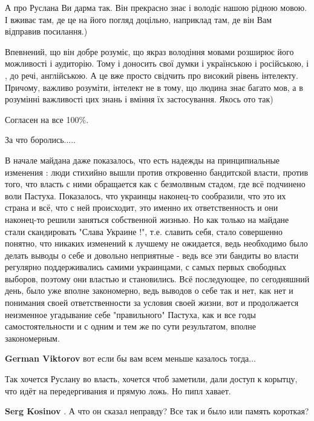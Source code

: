 \begin{itemize}
\begin{itemize}
А про Руслана Ви дарма так. Він прекрасно знає і володіє нашою рідною мовою. І
вживає там, де це на його погляд доцільно, наприклад там, де він Вам відправив
посилання.)

Впевнений, що він добре розуміє, що якраз володіння мовами розширює його
можливості і аудиторію. Тому і доносить свої думки і українською і російською,
і , до речі, англійською. А це вже просто свідчить про високий рівень
інтелекту. Причому, важливо розуміти, інтелект не в тому, що людина знає багато
мов, а в розумінні важливості цих знань і вміння їх застосування. Якось ото
так)

\end{itemize} %

Согласен на все 100\%.

За что боролись.....


В начале майдана даже показалось, что есть надежды на принципиальные изменения
: люди стихийно вышли против откровенно бандитской власти, против того, что
власть с ними обращается как с безмолвным стадом, где всё подчинено воли
Пастуха. Показалось, что украинцы наконец-то сообразили, что это их страна и
всё, что с ней происходит, это именно их ответственность и они наконец-то
решили заняться собственной жизнью. Но как только на майдане стали скандировать
"Слава Украине !", т.е. славить себя, стало совершенно понятно, что никаких
изменений к лучшему не ожидается, ведь необходимо было делать выводы о себе и
довольно неприятные - ведь все эти бандиты во власти регулярно поддерживались
самими украинцами, с самых первых свободных выборов, поэтому они властью и
становились. Всё последующее, по сегодняшний день, было уже вполне закономерно,
ведь выводов о себе так и нет, как нет и понимания своей ответственности за
условия своей жизни, вот и продолжается неизменное угадывание себе
"правильного" Пастуха, как и все годы самостоятельности и с одним и тем же по
сути результатом, вполне закономерным.

\textbf{German Viktorov} вот если бы вам всем меньше казалось тогда...

Так хочется Руслану во власть, хочется чтоб заметили, дали доступ к корытцу, что идёт на передергивания и прямую ложь. Но пипл хавает.

\begin{itemize} %
\textbf{Serg Kosinov} . А что он сказал неправду? Все так и было или память короткая?


\end{itemize}
\end{itemize}
